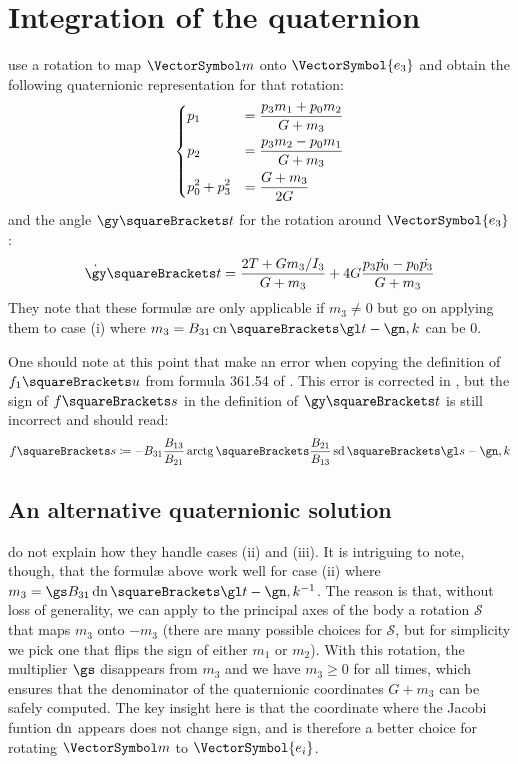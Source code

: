 \documentclass[10pt, a4paper, twoside]{basestyle}
\begin{document}
\section*{Integration of the quaternion}
\cite{Celledoni2007} use a rotation to map $\vm$ onto $\VectorSymbol{e_3}$ and obtain the following quaternionic representation for that rotation:
\[
\begin{dcases}
p_1 &= \frac{p_3 m_1 + p_0 m_2}{G + m_3} \\
p_2 &= \frac{p_3 m_2 - p_0 m_1}{G + m_3} \\
p_0^2 + p_3^2 &= \frac{G + m_3}{2 G}
\end{dcases}
\]
and the angle $\gy\of{t}$ for the rotation around $\VectorSymbol{e_3}$:
\[
\TimeDerivative{\gy}\of{t} = \frac{2 T + G m_3 / I_3}{G + m_3} + 4 G \frac{p_3 \TimeDerivative{p_0} - p_0 \TimeDerivative{p_3}}{G + m_3}
\]
They note that these formul{\ae} are only applicable if $m_3 \neq 0$ but go on applying them to case (i) where $m_3 = B_{31} \JacobiCN\of{\gl t - \gn, k}$
can be $0$.

One should note at this point that \cite{Celledoni2007} make an error when copying the definition of $f_1\of{u}$ from formula 361.54 of 
\cite{ByrdFriedman1954}.  This error is corrected in \cite{Celledoni2008}, but the sign of $f\of{s}$ in the definition of $\gy\of{t}$ is
still incorrect and should read:
\[
f\of{s} \DefineAs -B_{31} \frac{B_{13}}{B_{21}} \InverseTrigonometricTangent\of{\frac{B_{21}}{B_{13}} \JacobiSD\of{\gl s - \gn, k}}
\]

\subsection*{An alternative quaternionic solution}
\cite{Celledoni2007} do not explain how they handle cases (ii) and (iii).  It is intriguing to note, though, that the formul{\ae} above work well
for case (ii) where $m_3 = \gs B_{31} \JacobiDN\of{\gl t - \gn, k^{-1}}$.  The reason is that, without loss of generality, we can apply to the principal
axes of the body a rotation $\mathscr S$ that maps $m_3$ onto $-m_3$ (there are many possible choices for $\mathscr S$, but for simplicity we pick one that flips the sign of
either $m_1$ or $m_2$).  With this rotation, the multiplier $\gs$ disappears from $m_3$ and we have $m_3 \geq 0$ for all times, which ensures that
the denominator of the quaternionic coordinates $G + m_3$ can be safely computed.  The key insight here is that the coordinate where the Jacobi funtion
$\operatorname{dn}$ appears does not change sign, and is therefore a better choice for rotating $\vm$ to $\VectorSymbol{e_i}$.
\end{document}
